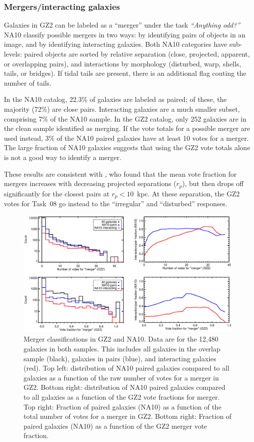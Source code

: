 \documentclass[useAMS,usenatbib]{mn2e}
\begin{document}
\subsubsection{Mergers/interacting galaxies}

Galaxies in GZ2 can be labeled as a ``merger'' under the task {\it ``Anything odd?''} NA10 classify possible mergers in two ways: by identifying pairs of objects in an image, and by identifying interacting galaxies. Both NA10 categories have sub-levels: paired objects are sorted by relative separation (close, projected, apparent, or overlapping pairs), and interactions by morphology (disturbed, warp, shells, tails, or bridges). If tidal tails are present, there is an additional flag couting the number of tails. 

In the NA10 catalog, 22.3\% of galaxies are labeled as paired; of these, the majority (72\%) are close pairs. Interacting galaxies are a much smaller subset, comprising 7\% of the NA10 sample. In the GZ2 catalog, only 252 galaxies are in the clean sample identified as merging. If the vote totals for a possible merger are used instead, 3\% of the NA10 paired galaxies have at least 10 votes for a merger. The large fraction of NA10 galaxies suggests that using the GZ2 vote totals alone is not a good way to identify a merger. 

These results are consistent with \citet{cas13}, who found that the mean vote fraction for mergers increases with decreasing projected separations ($r_p$), but then drops off significantly for the closest pairs at $r_p < 10$~kpc. At these separation, the GZ2 votes for Task~08 go instead to the ``irregular'' and ``disturbed'' responses. 

\begin{figure}
\includegraphics[angle=0,width=7.0in]{figures/na_pairs.eps}
\caption{Merger classifications in GZ2 and NA10. Data are for the 12,480 galaxies in both samples. This includes all galaxies in the overlap sample (black), galaxies in pairs (blue), and interacting galaxies (red). Top left: distribution of NA10 paired galaxies compared to all galaxies as a function of the raw number of votes for a merger in GZ2. Bottom right: distribution of NA10 paired galaxies compared to all galaxies as a function of the GZ2 vote fractions for merger. Top right: Fraction of paired galaxies (NA10) as a function of the total number of votes for a merger in GZ2. Bottom right: Fraction of paired galaxies (NA10) as a function of the GZ2 merger vote fraction. 
\label{fig-na_pairs}}
\end{figure}
\end{document}
